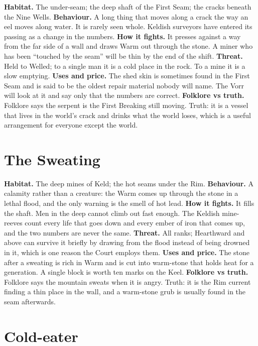 \documentclass{design/chronicle}
\begin{document}
\textbf{Habitat.} The under-seam; the deep shaft of the First Seam; the cracks beneath the Nine Wells. \textbf{Behaviour.} A long thing that moves along a crack the way an eel moves along water. It is rarely seen whole. Keldish surveyors have entered its passing as a change in the numbers. \textbf{How it fights.} It presses against a way from the far side of a wall and draws Warm out through the stone. A miner who has been “touched by the seam” will be thin by the end of the shift. \textbf{Threat.} Held to Welled; to a single man it is a cold place in the rock. To a mine it is a slow emptying. \textbf{Uses and price.} The shed skin is sometimes found in the First Seam and is said to be the oldest repair material nobody will name. The Vorr will look at it and say only that the numbers are correct. \textbf{Folklore vs truth.} Folklore says the serpent is the First Breaking still moving. Truth: it is a vessel that lives in the world’s crack and drinks what the world loses, which is a useful arrangement for everyone except the world.

\section*{The Sweating}

\textbf{Habitat.} The deep mines of Keld; the hot seams under the Rim. \textbf{Behaviour.} A calamity rather than a creature: the Warm comes up through the stone in a lethal flood, and the only warning is the smell of hot lead. \textbf{How it fights.} It fills the shaft. Men in the deep cannot climb out fast enough. The Keldish mine-reeves count every life that goes down and every ember of iron that comes up, and the two numbers are never the same. \textbf{Threat.} All ranks; Hearthward and above can survive it briefly by drawing from the flood instead of being drowned in it, which is one reason the Court employs them. \textbf{Uses and price.} The stone after a sweating is rich in Warm and is cut into warm-stone that holds heat for a generation. A single block is worth ten marks on the Keel. \textbf{Folklore vs truth.} Folklore says the mountain sweats when it is angry. Truth: it is the Rim current finding a thin place in the wall, and a warm-stone grub is usually found in the seam afterwards.

\section*{Cold-eater}
\end{document}
